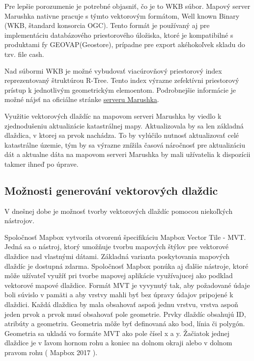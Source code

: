 \documentclass[12pt]{article}
\begin{document}
 Pre lepšie porozumenie je potrebné objasniť, čo je to WKB súbor. Mapový server Marushka nativne pracuje s týmto vektorovým formátom, Well known Binary (WKB, štandard konsorcia OGC). Tento formát je používaný aj pre implementáciu databázového priestorového úložiska, ktoré je kompatibilné s produktami fy GEOVAP(Geostore), prípadne pre export akéhokoľvek skladu do tzv. file cash.
 
 Nad súbormi WKB je možné vybudovať viacúrovňový priestorový index reprezentovaný štruktúrou R-Tree. Tento index výrazne zefektívni priestorový prístup k jednotlivým geometrickým elemoentom. Podrobnejšie informácie je možné nájsť na oficiálne stránke  \href{http://geovap.q2.cz/marushka/cz/produkty-a-sluzby/categoryId/3/souborove-vektorove-formaty-/popis/architektura/2#item15}{ serveru Marushka}.
 
Využitie vektorových dlaždíc na mapovom serveri Marushka by viedlo k zjednodušeniu aktualizácie katastrálnej mapy. Aktualizovala by sa len základná dlaždica, v ktorej sa prvok nachádza. To by vylúčilo nutnosť aktualizovať celé katastrálne územie, tým by sa výrazne znížila časová náročnosť pre aktualizáciu dát a aktualne dáta na mapovom serveri Marushka by mali užívatelia k dispozícii takmer ihneď po úprave.

\subsection{Možnosti generování vektorových dlaždic}

 V dnešnej dobe je možnosť tvorby vektorových dlaždíc pomocou niekoľkých nástrojov.
 
Spoločnosť Mapbox vytvorila otvorenú špecifikáciu Mapbox Vector Tile - MVT. Jedná sa o nástroj, ktorý umožňuje tvorbu mapových štýlov pre vektorové dlaždice nad vlastnými dátami. Základná varianta poskytovania mapových dlaždíc je dostupná zdarma. Spoločnosť Mapbox ponúka aj ďalšie nástroje, ktoré môže užívateľ využíť pri tvorbe mapovej aplikácie využívajucej ako podklad vektorové mapové dlaždice. Formát MVT je vyvynutý tak, aby požadované údaje boli súvislo v pamäti a aby vrstvy mahli byť bez úpravy údajov pripojené k dlaždici. Každá dlaždica by mala obsahovať aspoň jednu vrstvu, vrstva aspoň jeden prvok a prvok musí obsahovať pole geometrie. Prvky dlaždíc obsahujú ID, atribúty a geometriu. Geometria môže byť definovaná ako bod, línia či polygón. Geometria sa ukladá vo formáte MVT ako pole čísel x a y. Žačiatok jednej dlaždice je  v ľavom hornom rohu a koniec na dolnom okraji alebo v dolnom pravom rohu ( Mapbox 2017 ).
\end{document}
